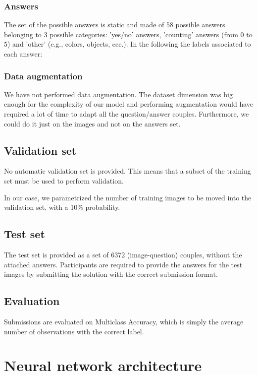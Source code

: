 \documentclass[12pt,a4paper]{report}
\begin{document}
	\subsection{Answers}
The set of the possible answers is static and made of 58 possible answers belonging to 3 possible categories: 'yes/no' answers, 'counting' answers (from 0 to 5) and 'other' (e.g., colors, objects, ecc.). In the following the labels associated to each answer:

	\subsection{Data augmentation}
We have not performed data augmentation. The dataset dimension was big enough for the complexity of our model and performing augmentation would have required a lot of time to adapt all the question/answer couples. Furthermore, we could do it just on the images and not on the answers set.
	\section{Validation set}

No automatic validation set is provided. This means that a subset of the training set must be used to perform validation.

In our case, we parametrized the number of training images to be moved into the validation set, with a 10\% probability.


	\section{Test set}
The test set is provided as a set of 6372 (image-question) couples, without the attached answers. Participants are required to provide the answers for the test images by submitting the solution with the correct submission format.

	\section{Evaluation}
Submissions are evaluated on Multiclass Accuracy, which is simply the average number of observations with the correct label.


	\chapter{Neural network architecture}		
\end{document}
